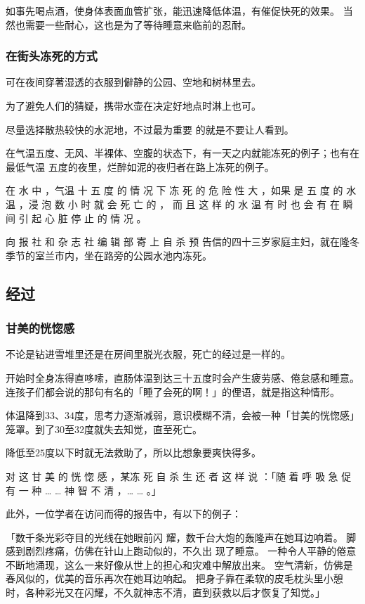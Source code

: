 \documentclass[UTF8]{ctexart}
\begin{document}
如事先喝点酒，使身体表面血管扩张，能迅速降低体温，有催促快死的效果。
当然也需要一些耐心，这也是为了等待睡意来临前的忍耐。


\subsubsection*{在街头冻死的方式}

可在夜间穿著湿透的衣服到僻静的公园、空地和树林里去。

为了避免人们的猜疑，携带水壶在决定好地点时淋上也可。

尽量选择散热较快的水泥地，不过最为重要 的就是不要让人看到。 

在气温五度、无风、半裸体、空腹的状态下，有一天之内就能冻死的例子；也有在最低气温 五度的夜里，烂醉如泥的夜归者在路上冻死的例子。

在 水 中 ，气温 十 五 度 的 情 况 下 冻 死 的 危 险 性 大 ，如果 是 五 度 的 水 温 ，浸 泡 数 小 时 就 会 死 亡 的 ， 而 且 这 样 的 水 温 有 时 也 会 有 在 瞬 间 引 起 心 脏 停 止 的 情 况 。

向 报 社 和 杂 志 社 编 辑 部 寄 上 自 杀 预 告信的四十三岁家庭主妇，就在隆冬季节的室兰市内，坐在路旁的公园水池内冻死。


\subsection{经过}

\subsubsection*{甘美的恍惚感}

不论是钻进雪堆里还是在房间里脱光衣服，死亡的经过是一样的。

开始时全身冻得直哆嗦，直肠体温到达三十五度时会产生疲劳感、倦怠感和睡意。连孩子们都会说的那句有名的「睡了会死的啊！」的俚语，就是指这种情形。

体温降到$33$、$34$度，思考力逐渐减弱，意识模糊不清，会被一种「甘美的恍惚感」笼罩。到了$30$至$32$度就失去知觉，直至死亡。

降低至$25$度以下时就无法救助了，所以比想象要爽快得多。

对 这 甘 美 的 恍 惚 感 ，某冻 死 自 杀 生 还 者 这 样 说 ：「随 着 呼 吸 急 促 有 一 种 … … 神 智 不 清 ，… … 。」

此外，一位学者在访问而得的报告中，有以下的例子：

「数千条光彩夺目的光线在她眼前闪 耀，数千台大炮的轰隆声在她耳边响着。
脚感到剧烈疼痛，仿佛在针山上跑动似的，不久出 现了睡意。
一种令人平静的倦意不断地涌现，这么一来好像从世上的担心和灾难中解放出来。
空气清新，仿佛是春风似的，优美的音乐再次在她耳边响起。
把身子靠在柔软的皮毛枕头里小憩时，各种彩光又在闪耀，不久就神志不清，直到获救以后才恢复了知觉。」 
\end{document}
